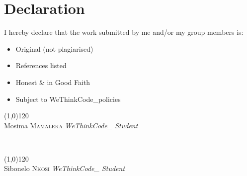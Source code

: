 \section*{Declaration}

I hereby declare that the work submitted by me and/or my group members is:
\begin{itemize}
    \item Original (not plagiarised)
    \item References listed
    \item Honest \& in Good Faith
    \item Subject to WeThinkCode\_policies
\end{itemize}

\vspace{15mm}

\begin{minipage}{0.4\textwidth}
    \begin{flushleft}
        \large
        \line(1,0){120}\\
        Mosima \textsc{Mamaleka} %
        \textit{WeThinkCode\_ Student}\\
    \end{flushleft}
\end{minipage}
~
\begin{minipage}{0.4\textwidth}
    \begin{flushright}
        \large
        \line(1,0){120}\\
        Sibonelo \textsc{Nkosi} %
        \textit{WeThinkCode\_ Student}\\
    \end{flushright}
\end{minipage}

